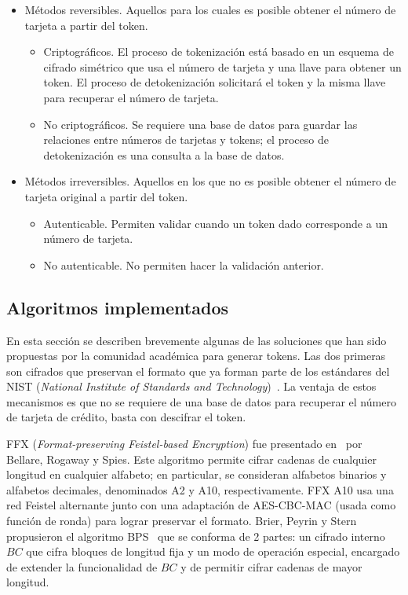 \documentclass[conference]{IEEEtran}
\begin{document}
  \begin{itemize}
    \item Métodos reversibles. Aquellos para los cuales es posible obtener el
      número de tarjeta a partir del token.
      \begin{itemize}
        \item Criptográficos. El proceso de tokenización está basado en un
          esquema de cifrado simétrico que usa el número de tarjeta y una llave
          para obtener un token. El proceso de detokenización solicitará el
          token y la misma llave para recuperar el número de tarjeta.
        \item No criptográficos. Se requiere una base de datos para guardar las
          relaciones entre números de tarjetas y tokens; el proceso de
          detokenización es una consulta a la base de datos.
      \end{itemize}
    \item Métodos irreversibles. Aquellos en los que no es posible obtener el
      número de tarjeta original a partir del token.
      \begin{itemize}
        \item Autenticable. Permiten validar cuando un token dado corresponde a
          un número de tarjeta.
        \item No autenticable. No permiten hacer la validación anterior.
    \end{itemize}
  \end{itemize}

  \subsection{Algoritmos implementados}
  \label{sec:implementaciones}

  En esta sección se describen brevemente algunas de las soluciones que han sido
  propuestas por la comunidad académica para generar tokens. Las dos primeras
  son cifrados que preservan el formato que ya forman parte de los estándares del
  NIST (\textit{National Institute of Standards and
  Technology})~\cite{nist_fpe}. La ventaja de estos mecanismos es que no se
  requiere de una base de datos para recuperar el número de tarjeta de crédito,
  basta con descifrar el token.

  FFX (\textit{Format-preserving Feistel-based Encryption}) fue presentado
  en~\cite{ffx_1} por Bellare, Rogaway y Spies. Este algoritmo permite cifrar
  cadenas de cualquier longitud en cualquier alfabeto; en particular, se
  consideran alfabetos binarios y alfabetos decimales, denominados A2 y A10,
  respectivamente. FFX A10 usa una red Feistel alternante junto con una
  adaptación de AES-CBC-MAC (usada como función de ronda) para lograr preservar
  el formato. Brier, Peyrin y Stern propusieron el algoritmo BPS~\cite{bps} que se
  conforma de 2 partes: un cifrado interno $BC$ que cifra bloques de longitud
  fija y un modo de operación especial, encargado de extender la funcionalidad
  de $BC$ y de permitir cifrar cadenas de mayor longitud.
\end{document}

